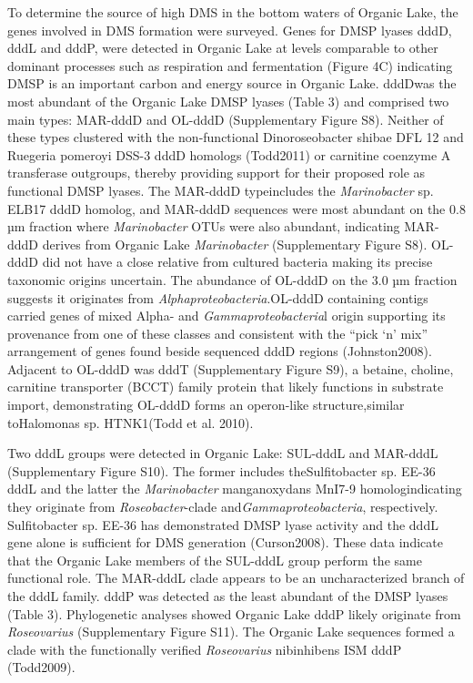 {{To determine the source of high \ac{DMS} in the bottom waters of Organic Lake, the genes involved in \ac{DMS} formation were surveyed. Genes for \ac{DMSP} lyases dddD, dddL and dddP, were detected in Organic Lake at levels comparable to other dominant processes such as respiration and fermentation (Figure 4C) indicating \ac{DMSP} is an important carbon and energy source in Organic Lake. dddDwas the most abundant of the Organic Lake \ac{DMSP} lyases (Table 3) and comprised two main types: MAR-dddD and OL-dddD (Supplementary Figure S8). Neither of these types clustered with the non-functional Dinoroseobacter shibae DFL 12 and Ruegeria pomeroyi DSS-3 dddD homologs (Todd2011) or carnitine coenzyme A transferase outgroups, thereby providing support for their proposed role as functional \ac{DMSP} lyases. The MAR-dddD typeincludes the \emph{Marinobacter} sp. ELB17 dddD homolog, and MAR-dddD sequences were most abundant on the 0.8 µm fraction where \emph{Marinobacter} \acp{OTU} were also abundant, indicating MAR-dddD derives from Organic Lake \emph{Marinobacter} (Supplementary Figure S8). OL-dddD did not have a close relative from cultured bacteria making its precise taxonomic origins uncertain. The abundance of OL-dddD on the 3.0 µm fraction suggests it originates from \emph{Alphaproteobacteria}.OL-dddD containing contigs carried genes of mixed Alpha- and \emph{Gammaproteobacteria}l origin supporting its provenance from one of these classes and consistent with the “pick ‘n’ mix” arrangement of genes found beside sequenced dddD regions (Johnston2008). Adjacent to OL-dddD was dddT (Supplementary Figure S9), a betaine, choline, carnitine transporter (BCCT) family protein that likely functions in substrate import, demonstrating OL-dddD forms an operon-like structure,similar toHalomonas sp. HTNK1(Todd et al. 2010).

Two dddL groups were detected in Organic Lake: SUL-dddL and MAR-dddL (Supplementary Figure S10). The former includes theSulfitobacter sp. EE-36 dddL and the latter the \emph{Marinobacter} manganoxydans MnI7-9 homologindicating they originate from \emph{Roseobacter}-clade and\emph{Gammaproteobacteria}, respectively. Sulfitobacter sp. EE-36 has demonstrated \ac{DMSP} lyase activity and the dddL gene alone is sufficient for \ac{DMS} generation (Curson2008). These data indicate that the Organic Lake members of the SUL-dddL group perform the same functional role. The MAR-dddL clade appears to be an uncharacterized branch of the dddL family. dddP was detected as the least abundant of the \ac{DMSP} lyases (Table 3). Phylogenetic analyses showed Organic Lake dddP likely originate from \emph{Roseovarius} (Supplementary Figure S11). The Organic Lake sequences formed a clade with the functionally verified \emph{Roseovarius} nibinhibens ISM dddP (Todd2009). 

}}

